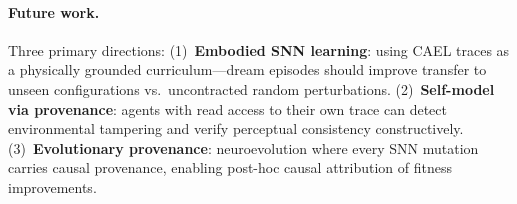\documentclass[sigconf,nonacm]{acmart}
\begin{document}
\paragraph{Future work.}
Three primary directions: (1)~\textbf{Embodied SNN learning}: using CAEL traces as a
physically grounded curriculum---dream episodes should improve transfer to unseen
configurations vs.\ uncontracted random perturbations.
(2)~\textbf{Self-model via provenance}: agents with read access to their own trace can
detect environmental tampering and verify perceptual consistency constructively.
(3)~\textbf{Evolutionary provenance}: neuroevolution where every SNN mutation carries
causal provenance, enabling post-hoc causal attribution of fitness improvements.




\balance
\end{document}
